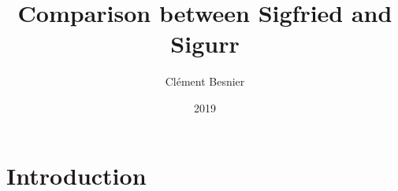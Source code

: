 \documentclass{article}
\title{Comparison between Sigfried and Sigur{\dh}r}
\author{Cl{\'e}ment Besnier}
\date{2019}
\begin{document}
\maketitle

\section{Introduction}



\nocite{*}


\end{document}
